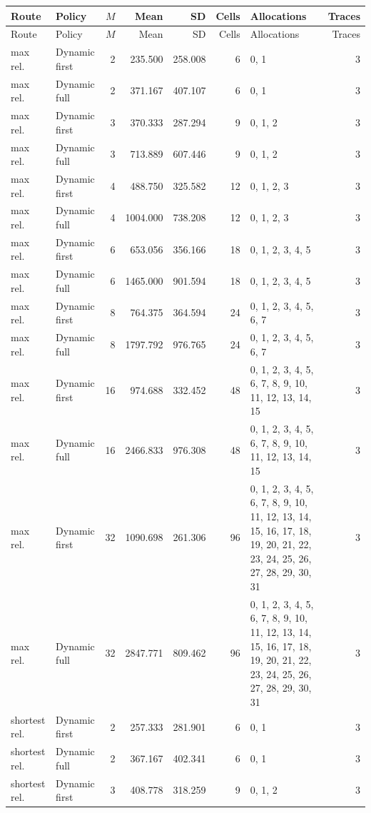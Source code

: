 \documentclass[10pt,a4paper]{article}
\begin{document}
\tiny\setlength{\tabcolsep}{2pt}\begin{longtable}{@{}p{23mm}p{29mm}rrrrp{36mm}r@{}}
\toprule Route & Policy & $M$ & Mean & SD & Cells & Allocations & Traces \\ \midrule\endfirsthead
\toprule Route & Policy & $M$ & Mean & SD & Cells & Allocations & Traces \\ \midrule\endhead
\bottomrule\endfoot
max rel. & Dynamic first & 2 & 235.500 & 258.008 & 6 & 0, 1 & 3 \\
max rel. & Dynamic full & 2 & 371.167 & 407.107 & 6 & 0, 1 & 3 \\
max rel. & Dynamic first & 3 & 370.333 & 287.294 & 9 & 0, 1, 2 & 3 \\
max rel. & Dynamic full & 3 & 713.889 & 607.446 & 9 & 0, 1, 2 & 3 \\
max rel. & Dynamic first & 4 & 488.750 & 325.582 & 12 & 0, 1, 2, 3 & 3 \\
max rel. & Dynamic full & 4 & 1004.000 & 738.208 & 12 & 0, 1, 2, 3 & 3 \\
max rel. & Dynamic first & 6 & 653.056 & 356.166 & 18 & 0, 1, 2, 3, 4, 5 & 3 \\
max rel. & Dynamic full & 6 & 1465.000 & 901.594 & 18 & 0, 1, 2, 3, 4, 5 & 3 \\
max rel. & Dynamic first & 8 & 764.375 & 364.594 & 24 & 0, 1, 2, 3, 4, 5, 6, 7 & 3 \\
max rel. & Dynamic full & 8 & 1797.792 & 976.765 & 24 & 0, 1, 2, 3, 4, 5, 6, 7 & 3 \\
max rel. & Dynamic first & 16 & 974.688 & 332.452 & 48 & 0, 1, 2, 3, 4, 5, 6, 7, 8, 9, 10, 11, 12, 13, 14, 15 & 3 \\
max rel. & Dynamic full & 16 & 2466.833 & 976.308 & 48 & 0, 1, 2, 3, 4, 5, 6, 7, 8, 9, 10, 11, 12, 13, 14, 15 & 3 \\
max rel. & Dynamic first & 32 & 1090.698 & 261.306 & 96 & 0, 1, 2, 3, 4, 5, 6, 7, 8, 9, 10, 11, 12, 13, 14, 15, 16, 17, 18, 19, 20, 21, 22, 23, 24, 25, 26, 27, 28, 29, 30, 31 & 3 \\
max rel. & Dynamic full & 32 & 2847.771 & 809.462 & 96 & 0, 1, 2, 3, 4, 5, 6, 7, 8, 9, 10, 11, 12, 13, 14, 15, 16, 17, 18, 19, 20, 21, 22, 23, 24, 25, 26, 27, 28, 29, 30, 31 & 3 \\
shortest rel. & Dynamic first & 2 & 257.333 & 281.901 & 6 & 0, 1 & 3 \\
shortest rel. & Dynamic full & 2 & 367.167 & 402.341 & 6 & 0, 1 & 3 \\
shortest rel. & Dynamic first & 3 & 408.778 & 318.259 & 9 & 0, 1, 2 & 3 \\

\end{longtable}
\end{document}
